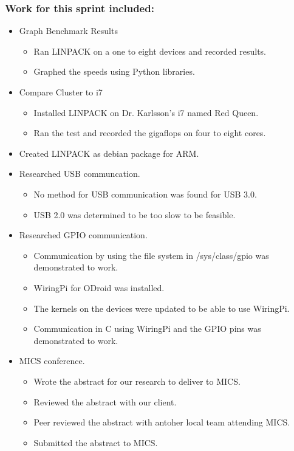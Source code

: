 \subsubsection*{Work for this sprint included:}
\begin{itemize}
	\item Graph Benchmark Results
	\begin{itemize}
		\item Ran LINPACK on a one to eight devices and recorded results.
		\item Graphed the speeds using Python libraries.
	\end{itemize}
	\item Compare Cluster to i7
	\begin{itemize}
		\item Installed LINPACK on Dr. Karlsson's i7 named Red Queen.
		\item Ran the test and recorded the gigaflops on four to eight cores.
	\end{itemize}
	\item Created LINPACK as debian package for ARM.
	\item Researched USB communcation.
	\begin{itemize}
		\item No method for USB communication was found for USB 3.0.
		\item USB 2.0 was determined to be too slow to be feasible.
	\end{itemize}
	\item Researched GPIO communication.
	\begin{itemize}
		\item Communication by using the file system in /sys/class/gpio was demonstrated to work.
		\item WiringPi for ODroid was installed.
		\item The kernels on the devices were updated to be able to use WiringPi.
		\item Communication in C using WiringPi and the GPIO pins was demonstrated to work.
	\end{itemize} 
	\item MICS conference.
	\begin{itemize}
		\item Wrote the abstract for our research to deliver to MICS.
		\item Reviewed the abstract with our client.
		\item Peer reviewed the abstract with antoher local team attending MICS.
		\item Submitted the abstract to MICS.
	\end{itemize}
\end{itemize}

